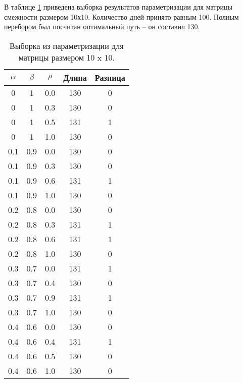         В таблице \ref{table:test:params} приведена выборка результатов параметризации
        для матрицы смежности размером 10х10. 
        Количество дней принято равным 100. 
        Полным перебором был посчитан оптимальный путь -- он составил 130.

    \begin{table}[h!]
        \caption{Выборка из параметризации для матрицы размером 10 x 10.}
        \label{table:test:params}
        \centering
        \begin{tabular}{|c|c|c|c|c|}
            \hline
            $\alpha$        & $\beta$      & $\rho$      & Длина  & Разница \\
            \hline
            0    & 1    & 0.0    & 130    & 0     \\
            0    & 1    & 0.3    & 130    & 0     \\
            0    & 1    & 0.5    & 131    & 1     \\
            0    & 1    & 1.0    & 130    & 0     \\
            \hline
            0.1  & 0.9  & 0.0    & 130    & 0     \\
            0.1  & 0.9  & 0.3    & 130    & 0     \\
            0.1  & 0.9  & 0.6    & 131    & 1     \\                    
            0.1  & 0.9  & 1.0    & 130    & 0     \\
            \hline
            0.2  & 0.8  & 0.0    & 130    & 0     \\
            0.2  & 0.8  & 0.3    & 131    & 1     \\
            0.2  & 0.8  & 0.6    & 131    & 1     \\
            0.2  & 0.8  & 1.0    & 130    & 0     \\
            \hline
            0.3  & 0.7  & 0.0  & 131    & 1     \\
            0.3  & 0.7  & 0.4  & 130    & 0     \\
            0.3  & 0.7  & 0.9  & 131    & 1     \\
            0.3  & 0.7  & 1.0  & 130    & 0     \\
            \hline
            0.4  & 0.6  & 0.0  & 130    & 0     \\
            0.4  & 0.6  & 0.4  & 131    & 1     \\
            0.4  & 0.6  & 0.5  & 130    & 0     \\
            0.4  & 0.6  & 1.0  & 130    & 0     \\

\end{tabular}
\end{table}
